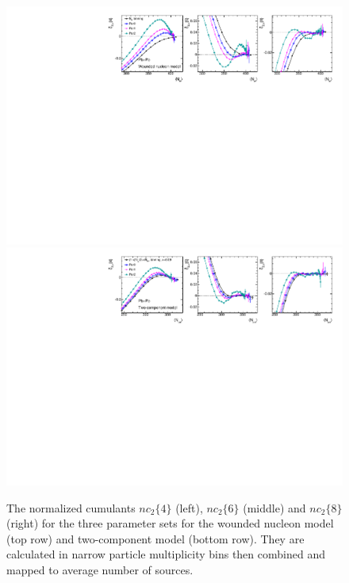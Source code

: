 \begin{figure}[H]
\centering
\includegraphics[width=.95\linewidth]{figs/chapter_centfluc/Glauber_nc2_Nw.pdf}
\includegraphics[width=.95\linewidth]{figs/chapter_centfluc/Glauber_nc2_Nan.pdf}
\caption{The normalized cumulants $nc_2\{4\}$ (left), $nc_2\{6\}$ (middle) and $nc_2\{8\}$ (right) for the three parameter sets for the wounded nucleon model (top row) and two-component model (bottom row). They are calculated in narrow particle multiplicity bins then combined and mapped to average number of sources.}
\label{fig:centfluc_Glauber_nc2}
\end{figure}

